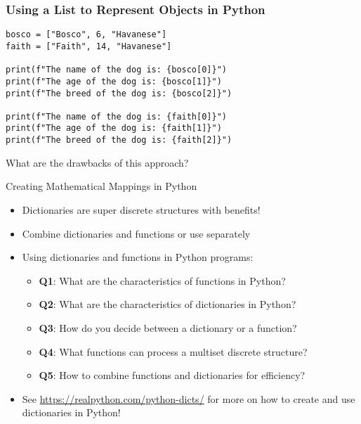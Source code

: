 \documentclass[14pt,aspectratio=169]{beamer}
\begin{document}
%
\begin{frame}[fragile]
  \frametitle{Using a List to Represent Objects in Python}
  \hspace*{-.15in}
  \begin{minipage}{6in}
    \vspace*{.1in}
    \begin{verbatim}
bosco = ["Bosco", 6, "Havanese"]
faith = ["Faith", 14, "Havanese"]

print(f"The name of the dog is: {bosco[0]}")
print(f"The age of the dog is: {bosco[1]}")
print(f"The breed of the dog is: {bosco[2]}")

print(f"The name of the dog is: {faith[0]}")
print(f"The age of the dog is: {faith[1]}")
print(f"The breed of the dog is: {faith[2]}")
    \end{verbatim}
  \end{minipage}
  \vspace*{.05in}
  \begin{center}
    \normalsize \noindent What are the drawbacks of this approach? \\
  \end{center}
\end{frame}

%
\begin{frame}{Creating Mathematical Mappings in Python}
  \begin{itemize}
    \item Dictionaries are super discrete structures with benefits!
      \vspace*{-.2in}
    \item Combine dictionaries and functions or use separately
      \vspace*{-.2in}
    \item Using dictionaries and functions in Python programs:
      \begin{itemize}
        \item {\bf Q1}: What are the characteristics of functions in Python?
        \item {\bf Q2}: What are the characteristics of dictionaries in Python?
        \item {\bf Q3}: How do you decide between a dictionary or a function?
        \item {\bf Q4}: What functions can process a multiset discrete
          structure?
        \item {\bf Q5}: How to combine functions and dictionaries for
          efficiency?
      \end{itemize}
      \vspace*{-.2in}
    \item See \url{https://realpython.com/python-dicts/} for more on how to
      create and use dictionaries in Python!
  \end{itemize}
\end{frame}
\end{document}
